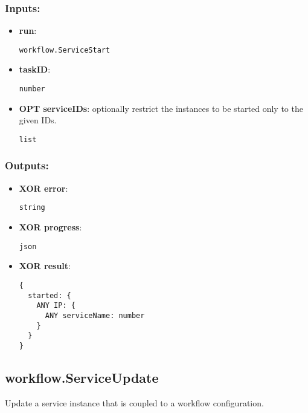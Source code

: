\subsubsection*{Inputs:}
\begin{itemize}
    \item \textbf{run}: 
\begin{lstlisting}
workflow.ServiceStart
\end{lstlisting}
    \item \textbf{taskID}: 
\begin{lstlisting}
number
\end{lstlisting}
    \item \textbf{OPT serviceIDs}: optionally restrict the instances to be started only to the given IDs.
\begin{lstlisting}
list
\end{lstlisting}
  \end{itemize}

\subsubsection*{Outputs:}
\begin{itemize}
    \item \textbf{XOR error}: 
\begin{lstlisting}
string
\end{lstlisting}
    \item \textbf{XOR progress}: 
\begin{lstlisting}
json
\end{lstlisting}
    \item \textbf{XOR result}: 
\begin{lstlisting}
{
  started: {
    ANY IP: {
      ANY serviceName: number
    }
  }
}
\end{lstlisting}
  \end{itemize}

\subsection{workflow.ServiceUpdate}
\label{ch:builtinservices:workflow.ServiceUpdate}
Update a service instance that is coupled to a workflow configuration.
